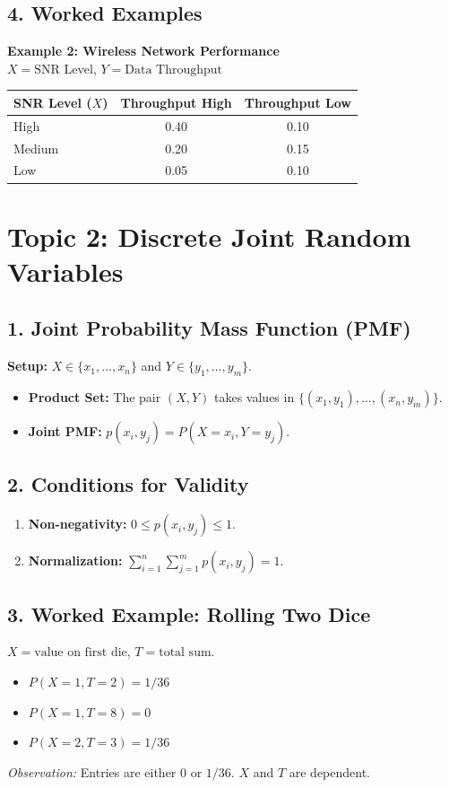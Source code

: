 \documentclass[12pt]{article}
\begin{document}
\subsection*{4. Worked Examples}
\textbf{Example 2: Wireless Network Performance} \\
$X = \text{SNR Level}$, $Y = \text{Data Throughput}$
\begin{center}
\begin{tabular}{lcc}
\toprule
SNR Level ($X$) & Throughput High & Throughput Low \\
\midrule
High & 0.40 & 0.10 \\
Medium & 0.20 & 0.15 \\
Low & 0.05 & 0.10 \\
\bottomrule
\end{tabular}
\end{center}

\newpage

\section*{Topic 2: Discrete Joint Random Variables}

\subsection*{1. Joint Probability Mass Function (PMF)}
\textbf{Setup:} $X \in \{x_1, \dots, x_n\}$ and $Y \in \{y_1, \dots, y_m\}$.
\begin{itemize}
    \item \textbf{Product Set:} The pair $(X, Y)$ takes values in $\{(x_1, y_1), \dots, (x_n, y_m)\}$.
    \item \textbf{Joint PMF:} $p(x_i, y_j) = P(X = x_i, Y = y_j)$.
\end{itemize}

\subsection*{2. Conditions for Validity}
\begin{enumerate}
    \item \textbf{Non-negativity:} $0 \le p(x_i, y_j) \le 1$.
    \item \textbf{Normalization:} $\sum_{i=1}^{n} \sum_{j=1}^{m} p(x_i, y_j) = 1$.
\end{enumerate}

\subsection*{3. Worked Example: Rolling Two Dice}
$X = \text{value on first die}$, $T = \text{total sum}$.
\begin{itemize}
    \item $P(X=1, T=2) = 1/36$
    \item $P(X=1, T=8) = 0$
    \item $P(X=2, T=3) = 1/36$
\end{itemize}
\textit{Observation:} Entries are either 0 or $1/36$. $X$ and $T$ are dependent.
\end{document}
